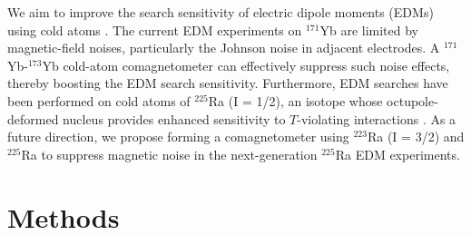 \documentclass[pdflatex,sn-nature,centre]{sn-jnl}%
\begin{document}

We aim to improve the search sensitivity of electric dipole moments (EDMs) using cold atoms \cite{Bishof2016RaEDM, Zheng2022YbEDM}. The current EDM experiments on $^{171}$Yb \cite{Zheng2022YbEDM} are limited by magnetic-field noises, particularly the Johnson noise in adjacent electrodes. A $^{171}$Yb-$^{173}$Yb cold-atom comagnetometer can effectively suppress such noise effects, thereby boosting the EDM search sensitivity. Furthermore, EDM searches have been performed on cold atoms of $^{225}$Ra (I = 1/2), an isotope whose octupole-deformed nucleus provides enhanced sensitivity to $\mathit T$-violating interactions \cite{Bishof2016RaEDM}. As a future direction, we propose forming a comagnetometer using $^{223}$Ra (I = 3/2) and $^{225}$Ra to suppress magnetic noise in the next-generation $^{225}$Ra EDM experiments.




\section*{Methods}
\end{document}
